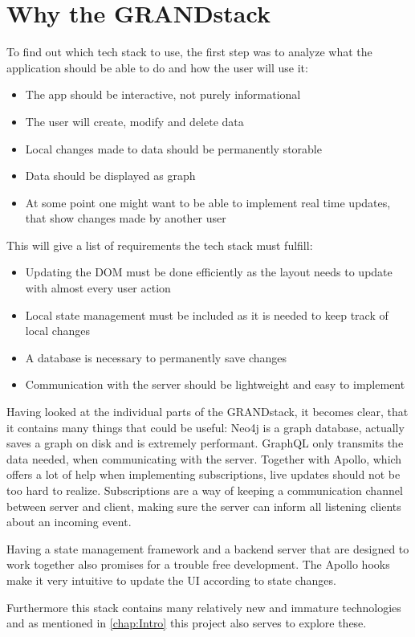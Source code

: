 \section{Why the GRANDstack}
To find out which tech stack to use, the first step was to analyze what the application should be able to do and how the user will use it:
\begin{itemize}
\item The app should be interactive, not purely informational
\item The user will create, modify and delete data
\item Local changes made to data should be permanently storable
\item Data should be displayed as graph
\item At some point one might want to be able to implement real time updates, that show changes made by another user
\end{itemize}
This will give a list of requirements the tech stack must fulfill:
\begin{itemize}
\item Updating the DOM must be done efficiently as the layout needs to update with almost every user action
\item Local state management must be included as it is needed to keep track of local changes
\item A database is necessary to permanently save changes
\item Communication with the server should be lightweight and easy to implement
\end{itemize}

Having looked at the individual parts of the GRANDstack, it becomes clear, that it contains many things that could be useful: Neo4j is a graph database, actually saves a graph on disk and is extremely performant. GraphQL only transmits the data needed, when communicating with the server. Together with Apollo, which offers a lot of help when implementing subscriptions, live updates should not be too hard to realize. Subscriptions are a way of keeping a communication channel between server and client, making sure the server can inform all listening clients about an incoming event.

Having a state management framework and a backend server that are designed to work together also promises for a trouble free development. The Apollo hooks make it very intuitive to update the UI according to state changes.

Furthermore this stack contains many relatively new and immature technologies and as mentioned in \autoref{chap:Intro} this project also serves to explore these.

